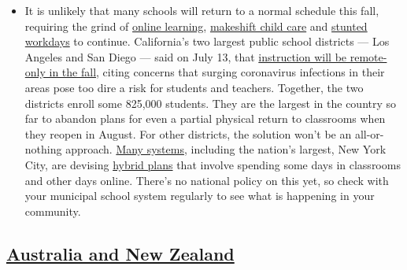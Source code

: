 \begin{itemize}
  \begin{itemize}
  \tightlist
  \item
    It is unlikely that many schools will return to a normal schedule
    this fall, requiring the grind of
    \href{https://www.nytimes3xbfgragh.onion/2020/06/05/us/coronavirus-education-lost-learning.html?action=click\&pgtype=Article\&state=default\&region=MAIN_CONTENT_3\&context=storylines_faq}{online
    learning},
    \href{https://www.nytimes3xbfgragh.onion/2020/05/29/us/coronavirus-child-care-centers.html?action=click\&pgtype=Article\&state=default\&region=MAIN_CONTENT_3\&context=storylines_faq}{makeshift
    child care} and
    \href{https://www.nytimes3xbfgragh.onion/2020/06/03/business/economy/coronavirus-working-women.html?action=click\&pgtype=Article\&state=default\&region=MAIN_CONTENT_3\&context=storylines_faq}{stunted
    workdays} to continue. California's two largest public school
    districts --- Los Angeles and San Diego --- said on July 13, that
    \href{https://www.nytimes3xbfgragh.onion/2020/07/13/us/lausd-san-diego-school-reopening.html?action=click\&pgtype=Article\&state=default\&region=MAIN_CONTENT_3\&context=storylines_faq}{instruction
    will be remote-only in the fall}, citing concerns that surging
    coronavirus infections in their areas pose too dire a risk for
    students and teachers. Together, the two districts enroll some
    825,000 students. They are the largest in the country so far to
    abandon plans for even a partial physical return to classrooms when
    they reopen in August. For other districts, the solution won't be an
    all-or-nothing approach.
    \href{https://bioethics.jhu.edu/research-and-outreach/projects/eschool-initiative/school-policy-tracker/}{Many
    systems}, including the nation's largest, New York City, are
    devising
    \href{https://www.nytimes3xbfgragh.onion/2020/06/26/us/coronavirus-schools-reopen-fall.html?action=click\&pgtype=Article\&state=default\&region=MAIN_CONTENT_3\&context=storylines_faq}{hybrid
    plans} that involve spending some days in classrooms and other days
    online. There's no national policy on this yet, so check with your
    municipal school system regularly to see what is happening in your
    community.
  \end{itemize}
\end{itemize}

\hypertarget{australia-and-new-zealand}{%
\subsection{\texorpdfstring{\href{https://www.nytimes3xbfgragh.onion/section/world/australia}{Australia
and New
Zealand}}{Australia and New Zealand}}\label{australia-and-new-zealand}}

